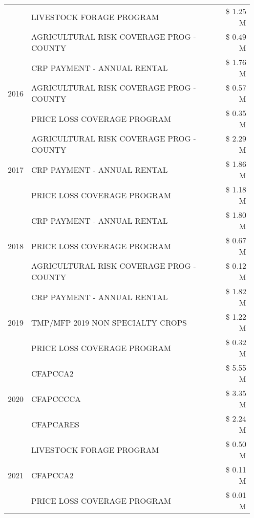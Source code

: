 \begin{tabular}{llr}
 & LIVESTOCK FORAGE PROGRAM & \$ 1.25 M \\
 & AGRICULTURAL RISK COVERAGE PROG - COUNTY & \$ 0.49 M \\
\cline{1-3}
\multirow[t]{3}{*}{2016} & CRP PAYMENT - ANNUAL RENTAL & \$ 1.76 M \\
 & AGRICULTURAL RISK COVERAGE PROG - COUNTY & \$ 0.57 M \\
 & PRICE LOSS COVERAGE PROGRAM & \$ 0.35 M \\
\cline{1-3}
\multirow[t]{3}{*}{2017} & AGRICULTURAL RISK COVERAGE PROG - COUNTY & \$ 2.29 M \\
 & CRP PAYMENT - ANNUAL RENTAL & \$ 1.86 M \\
 & PRICE LOSS COVERAGE PROGRAM & \$ 1.18 M \\
\cline{1-3}
\multirow[t]{3}{*}{2018} & CRP PAYMENT - ANNUAL RENTAL & \$ 1.80 M \\
 & PRICE LOSS COVERAGE PROGRAM & \$ 0.67 M \\
 & AGRICULTURAL RISK COVERAGE PROG - COUNTY & \$ 0.12 M \\
\cline{1-3}
\multirow[t]{3}{*}{2019} & CRP PAYMENT - ANNUAL RENTAL & \$ 1.82 M \\
 & TMP/MFP 2019 NON SPECIALTY CROPS & \$ 1.22 M \\
 & PRICE LOSS COVERAGE PROGRAM & \$ 0.32 M \\
\cline{1-3}
\multirow[t]{3}{*}{2020} & CFAPCCA2 & \$ 5.55 M \\
 & CFAPCCCCA & \$ 3.35 M \\
 & CFAPCARES & \$ 2.24 M \\
\cline{1-3}
\multirow[t]{3}{*}{2021} & LIVESTOCK FORAGE PROGRAM & \$ 0.50 M \\
 & CFAPCCA2 & \$ 0.11 M \\
 & PRICE LOSS COVERAGE PROGRAM & \$ 0.01 M \\
\cline{1-3}
\bottomrule
\end{tabular}
